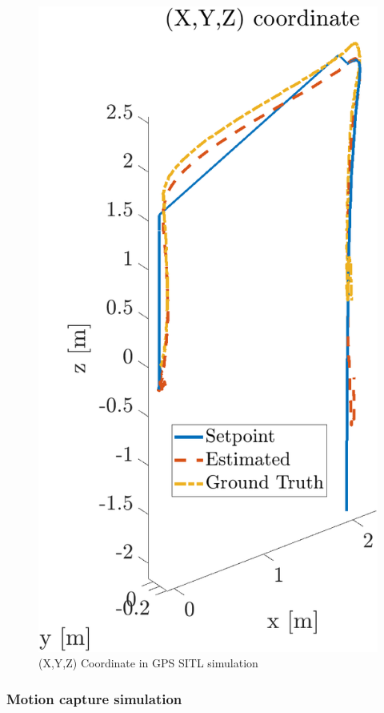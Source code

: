\documentclass[journal]{IEEEtran}
\begin{document}
\begin{figure}
    \centering
    \includegraphics[scale=0.2]{Images/SITL_GPS/XYZ_Sitl_gps.png}
    \caption{(X,Y,Z) Coordinate in GPS SITL simulation}
    \label{fig:SITL_GPS}
\end{figure}

\subsubsection{Motion capture simulation}
\end{document}
